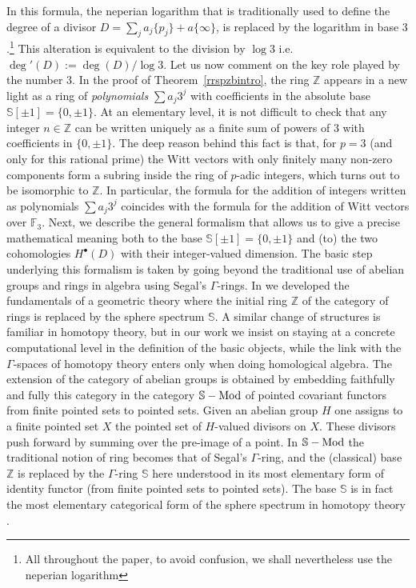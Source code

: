 \documentclass[cupthm]{CUP-JNL-JMJ}
\numberwithin{equation}{section}
\theoremstyle{cupplain}
\theoremstyle{cupdefinition}
\theoremstyle{cupremark}
\theoremstyle{cupproof}
\def\F{{\mathbb F}}
\def\S{{\mathbb S}}
\def\Z{{\mathbb Z}}
\def\sss{{\S}}
\def\spm{{\sss[\pm 1]}}
\def\smod{{\sss-{\rm{Mod}}}}
\begin{document}
In this formula,  the neperian logarithm  that is traditionally used to define the degree of a divisor $D=\sum_j a_j\{p_j\} + a\{\infty\}$, is replaced by the logarithm in base $3$.\footnote{All throughout the paper, to avoid confusion, we shall nevertheless use the neperian logarithm} This alteration is equivalent to the division by $\log 3$ i.e.  $\deg'(D):=\deg(D)/\log 3$.
Let us now comment on  the key role played by  the number $3$. In the  proof of Theorem~\ref{rrspzbintro}, the ring $\Z$
appears in a new light as a ring of \emph{polynomials} $\sum a_j 3^j$ with coefficients in the absolute base $\spm=\{0,\pm 1\}$. At an elementary level, it is not difficult to check that any integer $n\in \Z$ can be written uniquely as a finite sum of powers of $3$ with coefficients in $\{0,\pm 1\}$. The deep reason behind this  fact is that, for $p=3$ (and only for this rational prime) the Witt vectors with only finitely many non-zero components  
 form a subring  inside  the ring of $p$-adic integers, which turns out to be isomorphic to $\Z$.  In particular, the formula for the addition of integers written as polynomials $\sum a_j 3^j$ coincides with the formula for the addition of Witt vectors over $\F_3$. \newline
Next, we describe  the general  formalism that allows us to give a precise mathematical meaning both to  the base $\spm=\{0,\pm 1\}$ and (to) the two cohomologies $H^\bullet(D)$ with   their integer-valued dimension.  The basic step underlying this formalism is taken by  going beyond the traditional use of abelian groups and rings in algebra using  Segal's $\Gamma$-rings.  In \cite{CCprel, schemeF1} we   developed the fundamentals of a geometric theory where the initial ring $\Z$ of the category of rings is replaced by the sphere spectrum  $\sss$. A similar change of structures is  familiar in homotopy theory,  but in our work we insist on staying at a concrete computational level in the definition of the basic objects, while the link with the $\Gamma$-spaces of homotopy theory \cite{DGM}  enters only when doing homological algebra. The extension of the category of abelian groups is obtained by embedding faithfully and fully this category in the category $\smod$ of pointed covariant functors from finite pointed sets to pointed sets. Given an abelian group $H$ one assigns to a finite pointed set $X$ the pointed set of $H$-valued divisors on $X$. These divisors push forward by summing over the pre-image of a point. In  $\smod$ the traditional notion of ring becomes that of Segal's $\Gamma$-ring, and the  (classical) base $\Z$ is replaced by the $\Gamma$-ring $\sss$ here understood in its most elementary form of identity functor (from finite pointed sets to pointed sets). The base $\sss$ is in fact the most elementary categorical form of  the sphere spectrum in homotopy theory \cite{DGM}.
\end{document}

